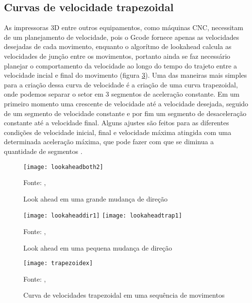 \subsection{Curvas de velocidade trapezoidal}
As impressoras 3D entre outros equipamentos, como máquinas CNC, necessitam
de um planejamento de velocidade, pois o Gcode fornece apenas as velocidades desejadas
de cada movimento, enquanto o algorítmo de lookahead calcula as velocidades
de junção entre os movimentos, portanto ainda se faz necessário planejar
o comportamento da velocidade ao longo do tempo do trajeto entre a velocidade incial
e final do movimento (figura \ref{fig:trapezoidal}).
Uma das maneiras mais simples para a criação dessa curva de velocidade é
a criação de uma curva trapezoidal, onde podemos separar o setor em 3 segmentos
de aceleração constante. Em um primeiro momento uma crescente de velocidade até
a velocidade desejada, seguido de um segmento de velocidade constante e por fim
um segmento de desaceleração constante até a velocidade final.
Alguns ajustes são feitos para as diferentes condições de velocidade inicial, final e
velocidade máxima atingida com uma determinada aceleração máxima, que pode
fazer com que se diminua a quantidade de segmentos \cite{yu20,klipperkinematic}.

\begin{figure}[!htb]
    \centering
    \caption{Look ahead em uma grande mudança de direção}
    \texttt{[image: lookaheadboth2]}

    {\footnotesize Fonte: \citeauthor{klipperkinematic}, \citeyear{klipperkinematic}}
    \label{fig:lookahead_big}
\end{figure}

\begin{figure}[!htb]
    \centering
    \caption{Look ahead em uma pequena mudança de direção}
    \texttt{[image: lookaheaddir1]}
    \texttt{[image: lookaheadtrap1]}

    {\footnotesize Fonte: \citeauthor{klipperkinematic}, \citeyear{klipperkinematic}}
    \label{fig:lookahead_small}
\end{figure}


\begin{figure}[!htb]
    \centering
    \caption{Curva de velocidades trapezoidal em uma sequência de movimentos}
    \texttt{[image: trapezoidex]}

    {\footnotesize Fonte: \citeauthor{klipperkinematic}, \citeyear{klipperkinematic}}
    \label{fig:trapezoidal}
\end{figure}


